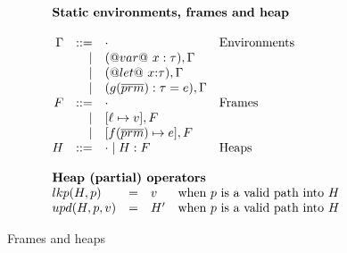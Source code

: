 \documentclass[nocopyrightspace,preprint,onecolumn,10pt]{sigplanconf}  %
\theoremstyle{remark}
\theoremstyle{definition}
\theoremstyle{plain}
\def\ol#1{\overline{#1}}
\begin{document}
\begin{figure}\small
\[\begin{array}{l}
  \begin{array}{rrll}
   \multicolumn{4}{l}{\text{\bf Static environments, frames and heap}} \\ \\ 
   \Gamma & ::=  & \cdot & \text{Environments } \\ 
          & \mid & (@var@~x:\tau),\Gamma & \\ 
          & \mid & (@let@~x{:}\tau),\Gamma & \\ 
          & \mid & (g(\ol{prm}) : \tau = e),\Gamma & \\
   F & ::=  & \cdot & \text{Frames} \\ 
     & \mid & [\ell \mapsto v],F \\ 
     & \mid & [f(\ol{prm}) \mapsto e],F & \\
   H & ::= & \cdot \mid H:F        & \text{Heaps}
  \end{array} \\ \\ 
  \begin{array}{lcll}
   \multicolumn{4}{l}{\text{\bf Heap (partial) operators}} \\
     lkp(H,p)   & = & v   & \text{when $p$ is a valid path into $H$} \\
     upd(H,p,v) & = & H'  & \text{when $p$ is a valid path into $H$}
  \end{array}
\end{array}\]
\caption{Frames and heaps}
  \label{fig:frames}
\end{figure}


\newcommand{\conf}[2]{#1 {\tt{;}} #2}
\end{document}
